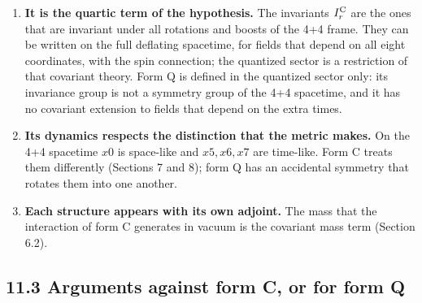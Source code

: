 \documentclass[
  10pt,
]{article}
\providecommand{\tightlist}{%
  \setlength{\itemsep}{0pt}\setlength{\parskip}{0pt}}
\begin{document}
\begin{enumerate}
\def\labelenumi{\arabic{enumi}.}
\tightlist
\item
  \textbf{It is the quartic term of the hypothesis.} The invariants
  \(I_r^{\rm C}\) are the ones that are invariant under all rotations
  and boosts of the 4+4 frame. They can be written on the full deflating
  spacetime, for fields that depend on all eight coordinates, with the
  spin connection; the quantized sector is a restriction of that
  covariant theory. Form Q is defined in the quantized sector only: its
  invariance group is not a symmetry group of the 4+4 spacetime, and it
  has no covariant extension to fields that depend on the extra times.
\item
  \textbf{Its dynamics respects the distinction that the metric makes.}
  On the 4+4 spacetime \(x0\) is space-like and \(x5,x6,x7\) are
  time-like. Form C treats them differently (Sections 7 and 8); form Q
  has an accidental symmetry that rotates them into one another.
\item
  \textbf{Each structure appears with its own adjoint.} The mass that
  the interaction of form C generates in vacuum is the covariant mass
  term (Section 6.2).
\end{enumerate}

\hypertarget{arguments-against-form-c-or-for-form-q}{%
\subsection{11.3 Arguments against form C, or for form
Q}\label{arguments-against-form-c-or-for-form-q}}
\end{document}
